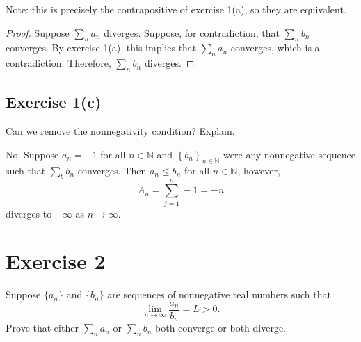 \documentclass[12pt]{article}
\newenvironment{problem}
    {\begin{lrbox}{\mybox}\begin{minipage}{0.98\textwidth}}
    {\end{minipage}\end{lrbox}\framebox[\textwidth]{\usebox{\mybox}}}
\newcommand{\N}{\mathbb{N}} %
\newcommand{\<}{\left\langle} %
\renewcommand{\>}{\right\rangle} %
\newcommand{\seq}[2][n]{\left\{#2\right\}_{#1\in\N}} %
\begin{document}
Note: this is precisely the contrapositive of exercise 1(a), so they are equivalent.

\begin{proof}
    Suppose $\sum_n a_n$ diverges. Suppose, for contradiction, that $\sum_n b_n$ converges. By exercise 1(a), this implies that $\sum_n a_n$ converges, which is a contradiction. Therefore, $\sum_n b_n$ diverges.
    
\end{proof}

\subsection*{Exercise 1(c)}
\begin{problem}
    Can we remove the nonnegativity condition? Explain.
\end{problem}
\medskip

No. Suppose $a_n=-1$ for all $n\in\N$ and $\seq{b_n}$ were any nonnegative sequence such that $\sum_b b_n$ converges. Then $a_n \leq b_n$ for all $n\in\N$, however,
\[A_n = \sum_{j=1}^n-1 = -n\]
diverges to $-\infty$ as $n\to\infty$.

\newpage
\section*{Exercise 2}
\begin{problem}
    Suppose $\{a_n\}$ and $\{b_n\}$ are sequences of nonnegative real numbers such that 
    \begin{equation}
        \lim_{n\to\infty} \frac{a_n}{b_n} = L > 0.
    \end{equation}
    Prove that either $\sum_n a_n$ or $\sum_n b_n$ both converge or both diverge.
\end{problem}
\end{document}
